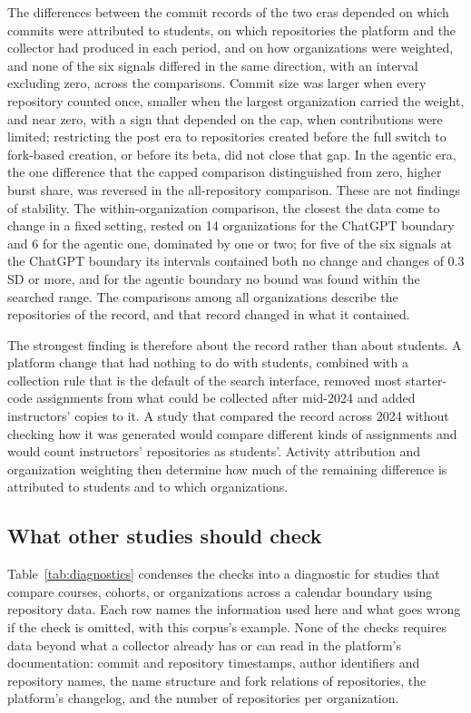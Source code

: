 \documentclass[acmsmall,screen,review,anonymous]{acmart}
\begin{document}
The differences between the commit records of the two eras depended on which commits were attributed to students, on which repositories the platform and the collector had produced in each period, and on how organizations were weighted, and none of the six signals differed in the same direction, with an interval excluding zero, across the comparisons. Commit size was larger when every repository counted once, smaller when the largest organization carried the weight, and near zero, with a sign that depended on the cap, when contributions were limited; restricting the post era to repositories created before the full switch to fork-based creation, or before its beta, did not close that gap. In the agentic era, the one difference that the capped comparison distinguished from zero, higher burst share, was reversed in the all-repository comparison. These are not findings of stability. The within-organization comparison, the closest the data come to change in a fixed setting, rested on 14 organizations for the ChatGPT boundary and 6 for the agentic one, dominated by one or two; for five of the six signals at the ChatGPT boundary its intervals contained both no change and changes of 0.3 SD or more, and for the agentic boundary no bound was found within the searched range. The comparisons among all organizations describe the repositories of the record, and that record changed in what it contained.

The strongest finding is therefore about the record rather than about students. A platform change that had nothing to do with students, combined with a collection rule that is the default of the search interface, removed most starter-code assignments from what could be collected after mid-2024 and added instructors' copies to it. A study that compared the record across 2024 without checking how it was generated would compare different kinds of assignments and would count instructors' repositories as students'. Activity attribution and organization weighting then determine how much of the remaining difference is attributed to students and to which organizations.

\subsection{What other studies should check}

Table~\ref{tab:diagnostics} condenses the checks into a diagnostic for studies that compare courses, cohorts, or organizations across a calendar boundary using repository data. Each row names the information used here and what goes wrong if the check is omitted, with this corpus's example. None of the checks requires data beyond what a collector already has or can read in the platform's documentation: commit and repository timestamps, author identifiers and repository names, the name structure and fork relations of repositories, the platform's changelog, and the number of repositories per organization.
\end{document}
